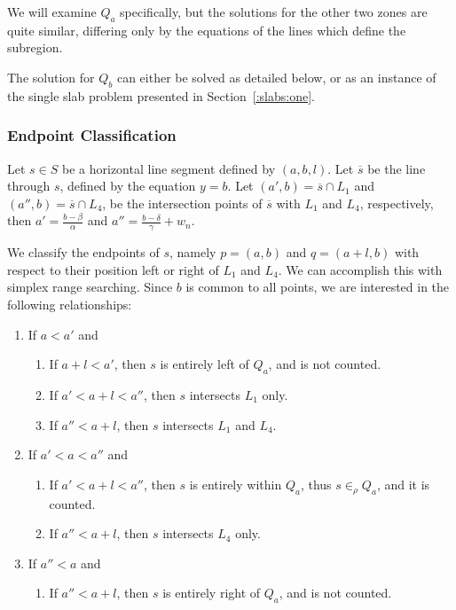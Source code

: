 We will examine $Q_a$ specifically, but the solutions for the other two zones are quite similar, differing only by the equations of the lines which define the subregion.

The solution for $Q_b$ can either be solved as detailed below, or as an instance of the single slab problem presented in Section~\ref{:slabs:one}.


\subsubsection{Endpoint Classification}

Let $s \in S$ be a horizontal line segment defined by $(a, b, l)$.  Let $\overline{s}$ be the line through $s$, defined by the equation $y = b$.  Let $(a', b) = \overline{s} \cap L_1$ and $(a'', b) = \overline{s} \cap L_4$, be the intersection points of $\overline{s}$ with $L_1$ and $L_4$, respectively, then $a' = \frac{b - \beta}{\alpha}$ and $a'' = \frac{b - \delta}{\gamma} + w_n$.

We classify the endpoints of $s$, namely $p = (a, b)$ and $q = (a + l, b)$ with respect to their position left or right of $L_1$ and $L_4$. We can accomplish this with simplex range searching. Since $b$ is common to all points, we are interested in the following relationships:

\begin{enumerate}
 \item If $a < a'$ and

 \begin{enumerate}
  \item If $a + l < a'$, then $s$ is entirely left of $Q_a$, and is not counted.
  \item If $a' < a + l < a''$, then $s$ intersects $L_1$ only.
  \item If $a'' < a + l$, then $s$ intersects $L_1$ and $L_4$.
 \end{enumerate}

 \item If $a' < a < a''$ and
 \begin{enumerate}
  \item If $a' < a + l < a''$, then $s$ is entirely within $Q_a$, thus $s \in_\rho Q_a$, and it is counted.
  \item If $a'' < a + l$, then $s$ intersects $L_4$ only.
 \end{enumerate}

 \item If $a'' < a$ and
 \begin{enumerate}
  \item If $a'' < a + l$, then $s$ is entirely right of $Q_a$, and is not counted.
 \end{enumerate}
\end{enumerate}

